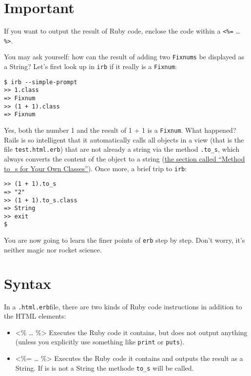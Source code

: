 \documentclass[a4paper]{book}
\begin{document}
\section{Important}\label{important-5}

If you want to output the result of Ruby code, enclose the code within a \texttt{\textless{}\%=} \ldots{} \texttt{\%\textgreater{}}.

You may ask yourself: how can the result of adding two \texttt{Fixnums} be displayed as a String? Let's first look up in \texttt{irb} if it really is a \texttt{Fixnum}:

\begin{shaded}\begin{verbatim}
$ irb --simple-prompt
>> 1.class
=> Fixnum
>> (1 + 1).class
=> Fixnum
\end{verbatim}\end{shaded}

Yes, both the number 1 and the result of 1 + 1 is a \texttt{Fixnum}. What happened? Rails is so intelligent that it automatically calls all objects in a view (that is the file \texttt{test.html.erb}) that are not already a string via the method \texttt{.to\_s}, which always converts the content of the object to a string (\hyperref[ruby-toux5fs]{the section called “Method to\_s for Your Own Classes”}). Once more, a brief trip to \texttt{irb}:

\begin{shaded}\begin{verbatim}
>> (1 + 1).to_s
=> "2"
>> (1 + 1).to_s.class
=> String
>> exit
$
\end{verbatim}\end{shaded}

You are now going to learn the finer points of \texttt{erb} step by step. Don't worry, it's neither magic nor rocket science.

\section{Syntax}\label{syntax}

In a \texttt{.html.erb}file, there are two kinds of Ruby code instructions in addition to the HTML elements:

\begin{itemize}
\itemsep1pt\parskip0pt
\item
  \textless{}\% \ldots{} \%\textgreater{} Executes the Ruby code it contains, but does not output anything (unless you explicitly use something like \texttt{print} or \texttt{puts}).
\item
  \textless{}\%= \ldots{} \%\textgreater{} Executes the Ruby code it contains and outputs the result as a String. If is is not a String the methode \texttt{to\_s} will be called.
\end{itemize}
\end{document}
